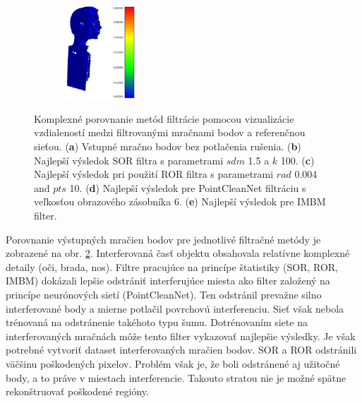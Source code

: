 \begin{figure}[H]
\begin{subfigure}[b]{0.19\textwidth}
		\centering
		\includegraphics[height=3.5cm]{figures/imbm_best.png}
		\caption{}
		\label{fig:best:e}
	\end{subfigure}
	\caption{Komplexné porovnanie metód filtrácie pomocou vizualizácie vzdialeností medzi filtrovanými mračnami bodov a referenčnou sieťou. (\textbf{a}) Vstupné mračno bodov bez potlačenia rušenia. (\textbf{b}) Najlepší výsledok SOR filtra s parametrami $sdm$ 1.5 a $k$ 100. (\textbf{c}) Najlepší výsledok pri použití ROR filtra s parametrami $rad$ 0.004 and $pts$ 10. (\textbf{d}) Najlepší výsledok pre PointCleanNet filtráciu s veľkosťou obrazového zásobníka 6. (\textbf{e}) Najlepší výsledok pre IMBM filter.}
	\label{fig:best}
\end{figure}

Porovnanie výstupných mračien bodov pre jednotlivé filtračné metódy je zobrazené na obr. \ref{fig:best}. Interferovaná časť objektu obsahovala relatívne komplexné detaily (oči, brada, nos). Filtre pracujúce na princípe štatistiky (SOR, ROR, IMBM) dokázali lepšie odstrániť interferujúce miesta ako filter založený na princípe neurónových sietí (PointCleanNet). Ten odstránil prevažne silno interferované body a mierne potlačil povrchovú interferenciu. Sieť však nebola trénovaná na odstránenie takéhoto typu šumu. Dotrénovaním siete na interferovaných mračnách môže tento filter vykazovať najlepšie výsledky. Je však potrebné vytvoriť dataset interferovaných mračien bodov. SOR a ROR odstránili väčšinu poškodených pixelov. Problém však je, že boli odstránené aj užitočné body, a to práve v miestach interferencie. Takouto stratou nie je možné spätne rekonštruovať poškodené regióny. 

